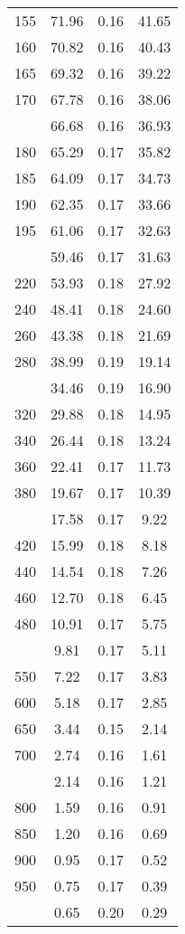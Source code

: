 \begin{table}[ht]
\begin{tabular}{lccc}
  155 & 71.96 & 0.16 & 41.65 \\ 
  160 & 70.82 & 0.16 & 40.43 \\ 
  165 & 69.32 & 0.16 & 39.22 \\ 
  170 & 67.78 & 0.16 & 38.06 \\ 
   \addlinespace
175 & 66.68 & 0.16 & 36.93 \\ 
  180 & 65.29 & 0.17 & 35.82 \\ 
  185 & 64.09 & 0.17 & 34.73 \\ 
  190 & 62.35 & 0.17 & 33.66 \\ 
  195 & 61.06 & 0.17 & 32.63 \\ 
   \addlinespace
200 & 59.46 & 0.17 & 31.63 \\ 
  220 & 53.93 & 0.18 & 27.92 \\ 
  240 & 48.41 & 0.18 & 24.60 \\ 
  260 & 43.38 & 0.18 & 21.69 \\ 
  280 & 38.99 & 0.19 & 19.14 \\ 
   \addlinespace
300 & 34.46 & 0.19 & 16.90 \\ 
  320 & 29.88 & 0.18 & 14.95 \\ 
  340 & 26.44 & 0.18 & 13.24 \\ 
  360 & 22.41 & 0.17 & 11.73 \\ 
  380 & 19.67 & 0.17 & 10.39 \\ 
   \addlinespace
400 & 17.58 & 0.17 & 9.22 \\ 
  420 & 15.99 & 0.18 & 8.18 \\ 
  440 & 14.54 & 0.18 & 7.26 \\ 
  460 & 12.70 & 0.18 & 6.45 \\ 
  480 & 10.91 & 0.17 & 5.75 \\ 
   \addlinespace
500 & 9.81 & 0.17 & 5.11 \\ 
  550 & 7.22 & 0.17 & 3.83 \\ 
  600 & 5.18 & 0.17 & 2.85 \\ 
  650 & 3.44 & 0.15 & 2.14 \\ 
  700 & 2.74 & 0.16 & 1.61 \\ 
   \addlinespace
750 & 2.14 & 0.16 & 1.21 \\ 
  800 & 1.59 & 0.16 & 0.91 \\ 
  850 & 1.20 & 0.16 & 0.69 \\ 
  900 & 0.95 & 0.17 & 0.52 \\ 
  950 & 0.75 & 0.17 & 0.39 \\ 
   \addlinespace
1000 & 0.65 & 0.20 & 0.29 \\ 
   \bottomrule
\end{tabular}
\end{table}
